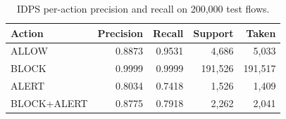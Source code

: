 \begin{table}[!t]
\centering
\caption{IDPS per-action precision and recall on 200,000 test flows.}\label{tab:idps}
\scriptsize
\setlength{\tabcolsep}{3pt}
\begin{tabular}{lrrrr}
\toprule
\textbf{Action} & \textbf{Precision} & \textbf{Recall} & \textbf{Support} & \textbf{Taken} \\
\midrule
ALLOW & 0.8873 & 0.9531 & 4,686 & 5,033 \\
BLOCK & 0.9999 & 0.9999 & 191,526 & 191,517 \\
ALERT & 0.8034 & 0.7418 & 1,526 & 1,409 \\
BLOCK+ALERT & 0.8775 & 0.7918 & 2,262 & 2,041 \\
\bottomrule
\end{tabular}
\end{table}
